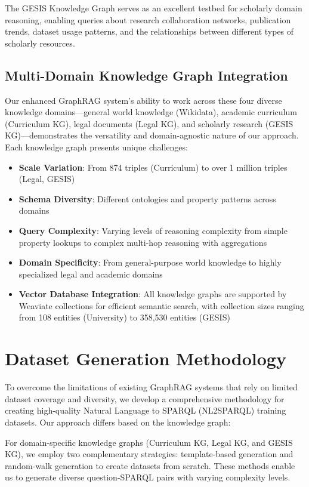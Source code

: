 The GESIS Knowledge Graph serves as an excellent testbed for scholarly domain reasoning, enabling queries about research collaboration networks, publication trends, dataset usage patterns, and the relationships between different types of scholarly resources.

\subsection{Multi-Domain Knowledge Graph Integration}

Our enhanced GraphRAG system's ability to work across these four diverse knowledge domains---general world knowledge (Wikidata), academic curriculum (Curriculum KG), legal documents (Legal KG), and scholarly research (GESIS KG)---demonstrates the versatility and domain-agnostic nature of our approach. Each knowledge graph presents unique challenges:

\begin{itemize}
    \item \textbf{Scale Variation}: From 874 triples (Curriculum) to over 1 million triples (Legal, GESIS)
    \item \textbf{Schema Diversity}: Different ontologies and property patterns across domains
    \item \textbf{Query Complexity}: Varying levels of reasoning complexity from simple property lookups to complex multi-hop reasoning with aggregations
    \item \textbf{Domain Specificity}: From general-purpose world knowledge to highly specialized legal and academic domains
    \item \textbf{Vector Database Integration}: All knowledge graphs are supported by Weaviate collections for efficient semantic search, with collection sizes ranging from 108 entities (University) to 358,530 entities (GESIS)
\end{itemize}

\section{Dataset Generation Methodology}
To overcome the limitations of existing GraphRAG systems that rely on limited dataset coverage and diversity, we develop a comprehensive methodology for creating high-quality Natural Language to SPARQL (NL2SPARQL) training datasets. Our approach differs based on the knowledge graph:

For domain-specific knowledge graphs (Curriculum KG, Legal KG, and GESIS KG), we employ two complementary strategies: template-based generation and random-walk generation to create datasets from scratch. These methods enable us to generate diverse question-SPARQL pairs with varying complexity levels.

